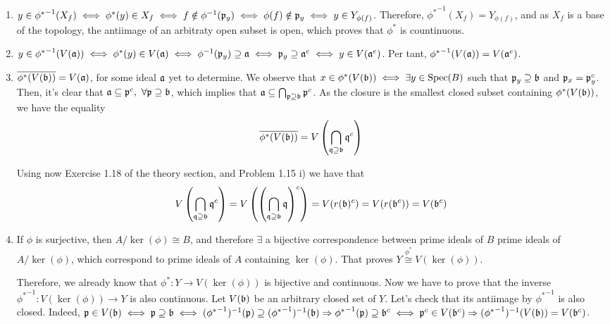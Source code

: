 \begin{sol}
	\begin{enumerate}[label=(\roman*)]
		\item $y \in {\phi^*}^{-1}(X_f) \iff \phi^*(y) \in X_f \iff f \notin \phi^{-1}(\mathfrak{p}_y) \iff \phi(f) \notin \mathfrak{p}_y \iff y \in Y_{\phi(f)}$. Therefore, ${\phi^*}^{-1}(X_f) = Y_{\phi(f)}$, and as $X_f$ is a base of the topology, the antiimage of an arbitraty open subset is open, which proves that $\phi^*$ is countinuous.

		\item $y \in {\phi^*}^{-1}(V(\mathfrak{a})) \iff \phi^*(y) \in V(\mathfrak{a}) \iff \phi^{-1}(\mathfrak{p}_y) \supseteq \mathfrak{a} \iff \mathfrak{p}_y \supseteq \mathfrak{a}^e \iff y \in V(\mathfrak{a}^e)$. Per tant, ${\phi^*}^{-1}(V(\mathfrak{a})) = V(\mathfrak{a}^e)$.

		\item $\overline{\phi^*(V(\mathfrak{b}))} = V(\mathfrak{a})$, for some ideal $\mathfrak{a}$ yet to determine. We observe that $x \in \phi^*(V(\mathfrak{b})) \iff \exists y \in \text{Spec}(B)$ such that $\mathfrak{p}_y \supseteq \mathfrak{b}$ and $\mathfrak{p}_x = \mathfrak{p}_y^c$. Then, it's clear that $\mathfrak{a} \subseteq \mathfrak{p}^c, \, \, \forall \mathfrak{p} \supseteq \mathfrak{b}$, which implies that $\mathfrak{a} \subseteq \bigcap_{\mathfrak{p} \supseteq \mathfrak{b}} \mathfrak{p}^c$. As the closure is the smallest closed subset containing $\phi^*(V(\mathfrak{b}))$, we have the equality 
		\[
			\overline{\phi^*(V(\mathfrak{b}))} = V \left ( \bigcap_{\mathfrak{q} \supseteq \mathfrak{b}} \mathfrak{q}^c \right )
		\]  

		Using now Exercise 1.18 of the theory section, and Problem 1.15 i) we have that 
		\[
			V \left ( \bigcap_{\mathfrak{q} \supseteq \mathfrak{b}} \mathfrak{q}^c \right ) = V \left (  \left ( \bigcap_{\mathfrak{q} \supseteq \mathfrak{b}} \mathfrak{q} \right )^c \right ) = V(r(\mathfrak{b})^c) = V(r(\mathfrak{b}^c)) = V(\mathfrak{b}^c)
		\]

		\item If $\phi$ is surjective, then $A/\ker(\phi) \cong B$, and therefore $\exists$ a bijective correspondence between prime ideals of $B$ prime ideals of $A/\ker(\phi)$, which correspond to prime ideals of $A$ containing $\ker(\phi)$. That proves $Y \overset{\phi^*}{\cong} V(\ker(\phi))$.

		Therefore, we already know that $\phi^*: Y \to V(\ker(\phi))$ is bijective and continuous. Now we have to prove that the inverse ${\phi^*}^{-1}: V(\ker(\phi)) \to Y$ is also continuous. Let $V(\mathfrak{b})$ be an arbitrary closed set of $Y$. Let's check that its antiimage by ${\phi^*}^{-1}$ is also closed. Indeed, $\mathfrak{p} \in V(\mathfrak{b}) \iff \mathfrak{p} \supseteq \mathfrak{b} \iff ({\phi^*}^{-1})^{-1}(\mathfrak{p}) \supseteq ({\phi^*}^{-1})^{-1}(\mathfrak{b}) \Rightarrow {\phi^*}^{-1}(\mathfrak{p}) \supseteq \mathfrak{b}^c  \iff \mathfrak{p}^c  \in V(\mathfrak{b}^c) \Rightarrow ({\phi^*}^{-1})^{-1}(V(\mathfrak{b})) = V(\mathfrak{b}^c)$.


\end{enumerate}
\end{sol}
